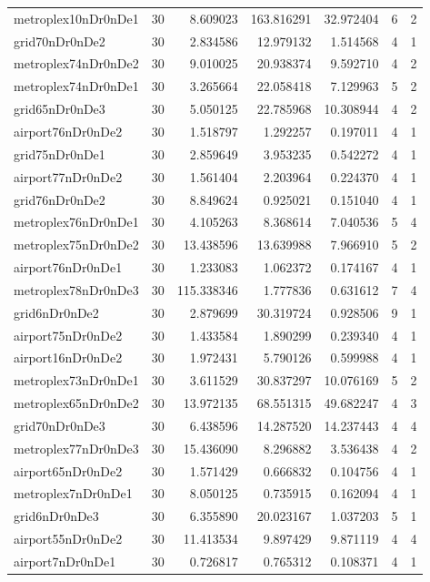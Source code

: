 \documentclass[../../../thesis.tex]{subfiles}
\begin{document}
\begin{longtable}{|l|r|r|r|r|r|r|}
metroplex10nDr0nDe1 & 30 & 8.609023 & 163.816291 & 32.972404 & 6 & 2 \\
grid70nDr0nDe2 & 30 & 2.834586 & 12.979132 & 1.514568 & 4 & 1 \\
metroplex74nDr0nDe2 & 30 & 9.010025 & 20.938374 & 9.592710 & 4 & 2 \\
metroplex74nDr0nDe1 & 30 & 3.265664 & 22.058418 & 7.129963 & 5 & 2 \\
grid65nDr0nDe3 & 30 & 5.050125 & 22.785968 & 10.308944 & 4 & 2 \\
airport76nDr0nDe2 & 30 & 1.518797 & 1.292257 & 0.197011 & 4 & 1 \\
grid75nDr0nDe1 & 30 & 2.859649 & 3.953235 & 0.542272 & 4 & 1 \\
airport77nDr0nDe2 & 30 & 1.561404 & 2.203964 & 0.224370 & 4 & 1 \\
grid76nDr0nDe2 & 30 & 8.849624 & 0.925021 & 0.151040 & 4 & 1 \\
metroplex76nDr0nDe1 & 30 & 4.105263 & 8.368614 & 7.040536 & 5 & 4 \\
metroplex75nDr0nDe2 & 30 & 13.438596 & 13.639988 & 7.966910 & 5 & 2 \\
airport76nDr0nDe1 & 30 & 1.233083 & 1.062372 & 0.174167 & 4 & 1 \\
metroplex78nDr0nDe3 & 30 & 115.338346 & 1.777836 & 0.631612 & 7 & 4 \\
grid6nDr0nDe2 & 30 & 2.879699 & 30.319724 & 0.928506 & 9 & 1 \\
airport75nDr0nDe2 & 30 & 1.433584 & 1.890299 & 0.239340 & 4 & 1 \\
airport16nDr0nDe2 & 30 & 1.972431 & 5.790126 & 0.599988 & 4 & 1 \\
metroplex73nDr0nDe1 & 30 & 3.611529 & 30.837297 & 10.076169 & 5 & 2 \\
metroplex65nDr0nDe2 & 30 & 13.972135 & 68.551315 & 49.682247 & 4 & 3 \\
grid70nDr0nDe3 & 30 & 6.438596 & 14.287520 & 14.237443 & 4 & 4 \\
metroplex77nDr0nDe3 & 30 & 15.436090 & 8.296882 & 3.536438 & 4 & 2 \\
airport65nDr0nDe2 & 30 & 1.571429 & 0.666832 & 0.104756 & 4 & 1 \\
metroplex7nDr0nDe1 & 30 & 8.050125 & 0.735915 & 0.162094 & 4 & 1 \\
grid6nDr0nDe3 & 30 & 6.355890 & 20.023167 & 1.037203 & 5 & 1 \\
airport55nDr0nDe2 & 30 & 11.413534 & 9.897429 & 9.871119 & 4 & 4 \\
airport7nDr0nDe1 & 30 & 0.726817 & 0.765312 & 0.108371 & 4 & 1 \\

\end{longtable}
\end{document}
